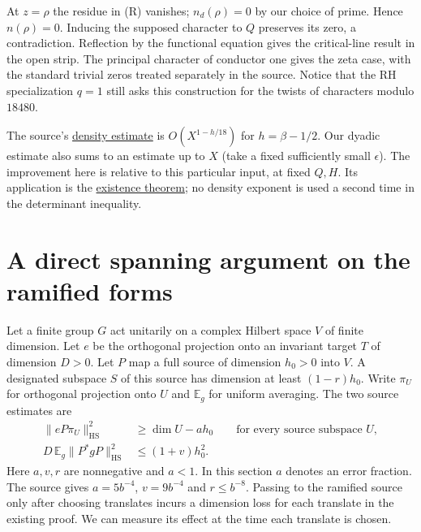\documentclass[11pt]{article}
\newcommand{\E}{\mathbb E}\newcommand{\tr}{\operatorname{tr}}\newcommand{\HS}{\mathrm{HS}}
\newcommand{\src}[3]{\href{https://github.com/VladimirReshetnikov/ProveIt/blob/d8415e76ad850651f8c0083afe689dd9f4a45a10/Analysis/GeneralizedRiemannHypothesis/vendor/grh-lean/grh/src/#1.lean\#L#2}{#3}}
\begin{document}
At $z=\rho$ the residue in (R) vanishes; $n_d(\rho)=0$ by our choice of prime. Hence $n(\rho)=0$. Inducing the supposed character to $Q$ preserves its zero, a contradiction. Reflection by the functional equation gives the critical-line result in the open strip. The principal character of conductor one gives the zeta case, with the standard trivial zeros treated separately in the source. Notice that the RH specialization $q=1$ still asks this construction for the twists of characters modulo $18480$.

The source's \src{Lib/Analytic/QuadraticTwist}{732}{density estimate} is $O(X^{1-h/18})$ for $h=\beta-1/2$. Our dyadic estimate also sums to an estimate up to $X$ (take a fixed sufficiently small $\epsilon$). The improvement here is relative to this particular input, at fixed $Q,H$. Its application is the \src{Lib/Analytic/QuadraticTwist}{796}{existence theorem}; no density exponent is used a second time in the determinant inequality.

\newpage
\section{A direct spanning argument on the ramified forms}\label{sec:span}
Let a finite group $G$ act unitarily on a complex Hilbert space $V$ of finite dimension. Let $e$ be the orthogonal projection onto an invariant target $T$ of dimension $D>0$. Let $P$ map a full source of dimension $h_0>0$ into $V$. A designated subspace $S$ of this source has dimension at least $(1-r)h_0$. Write $\pi_U$ for orthogonal projection onto $U$ and $\E_g$ for uniform averaging. The two source estimates are
\begin{align}
 \|eP\pi_U\|_{\HS}^2 &\ge \dim U- a h_0 \qquad\text{for every source subspace }U,\label{eq:near}\\
 D\,\E_g\|P^*gP\|_{\HS}^2 &\le(1+v)h_0^2.\label{eq:moment}
\end{align}
Here $a,v,r$ are nonnegative and $a<1$. In this section $a$ denotes an error fraction. The source gives $a=5b^{-4}$, $v=9b^{-4}$ and $r\le b^{-8}$. Passing to the ramified source only after choosing translates incurs a dimension loss for each translate in the existing proof. We can measure its effect at the time each translate is chosen.
\end{document}
